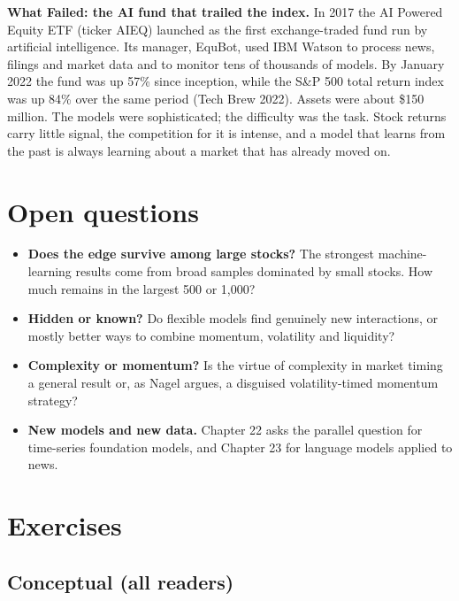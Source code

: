 \begin{callout}
\textbf{What Failed: the AI fund that trailed the index.} In 2017 the AI Powered Equity ETF (ticker AIEQ) launched as the first exchange-traded fund run by artificial intelligence. Its manager, EquBot, used IBM Watson to process news, filings and market data and to monitor tens of thousands of models. By January 2022 the fund was up 57\% since inception, while the S\&P 500 total return index was up 84\% over the same period (Tech Brew 2022). Assets were about \$150 million. The models were sophisticated; the difficulty was the task. Stock returns carry little signal, the competition for it is intense, and a model that learns from the past is always learning about a market that has already moved on.
\end{callout}

\section{Open questions}
\label{sec:21-open}

\begin{itemize}
  \item \textbf{Does the edge survive among large stocks?} The strongest machine-learning results come from broad samples dominated by small stocks. How much remains in the largest 500 or 1,000?
  \item \textbf{Hidden or known?} Do flexible models find genuinely new interactions, or mostly better ways to combine momentum, volatility and liquidity?
  \item \textbf{Complexity or momentum?} Is the virtue of complexity in market timing a general result or, as Nagel argues, a disguised volatility-timed momentum strategy?
  \item \textbf{New models and new data.} Chapter 22 asks the parallel question for time-series foundation models, and Chapter 23 for language models applied to news.
\end{itemize}

\section*{Exercises}

\subsection*{Conceptual (all readers)}

